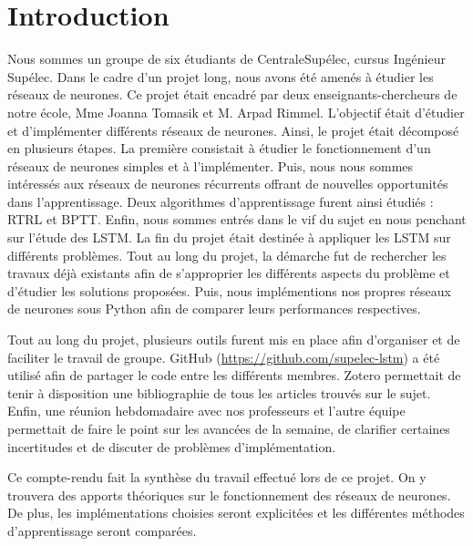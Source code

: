 \chapter*{Introduction} 
 
Nous sommes un groupe de six étudiants de CentraleSupélec, cursus Ingénieur Supélec. Dans le cadre d'un projet long, nous avons été amenés à étudier les réseaux de neurones. Ce projet était encadré par deux enseignants-chercheurs de notre école, Mme Joanna Tomasik et M. Arpad Rimmel. L'objectif était d'étudier et d'implémenter différents réseaux de neurones. Ainsi, le projet était décomposé en plusieurs étapes. La première consistait à étudier le fonctionnement d'un réseaux de neurones simples et à l'implémenter. Puis, nous nous sommes intéressés aux réseaux de neurones récurrents offrant de nouvelles opportunités dans l'apprentissage. Deux algorithmes d'apprentissage furent ainsi étudiés : RTRL et BPTT. Enfin, nous sommes entrés dans le vif du sujet en nous penchant sur l'étude des LSTM. La fin du projet était destinée à appliquer les LSTM sur différents problèmes. Tout au long du projet, la démarche fut de rechercher les travaux déjà existants afin de s'approprier les différents aspects du problème et d'étudier les solutions proposées. Puis, nous implémentions nos propres réseaux de neurones sous Python afin de comparer leurs performances respectives. 
 
Tout au long du projet, plusieurs outils furent mis en place afin d'organiser et de faciliter le travail de groupe. GitHub (\url{https://github.com/supelec-lstm}) a été utilisé afin de partager le code entre les différents membres. Zotero permettait de tenir à disposition une bibliographie de tous les articles trouvés sur le sujet. Enfin, une réunion hebdomadaire avec nos professeurs et l'autre équipe permettait de faire le point sur les avancées de la semaine, de clarifier certaines incertitudes et de discuter de problèmes d'implémentation. 
 
Ce compte-rendu fait la synthèse du travail effectué lors de ce projet. On y trouvera des apports théoriques sur le fonctionnement des réseaux de neurones. De  plus, les implémentations choisies seront explicitées et les différentes méthodes d'apprentissage seront comparées. 
 